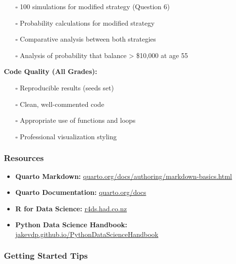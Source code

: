 \documentclass[
  letterpaper,
  DIV=11,
  numbers=noendperiod]{scrartcl}
\providecommand{\tightlist}{%
  \setlength{\itemsep}{0pt}\setlength{\parskip}{0pt}}
\theoremstyle{definition}
\theoremstyle{remark}
\begin{document}
\begin{itemize}
\tightlist
\item[$\square$]
  100 simulations for modified strategy (Question 6)
\item[$\square$]
  Probability calculations for modified strategy
\item[$\square$]
  Comparative analysis between both strategies
\item[$\square$]
  Analysis of probability that balance \textgreater{} \$10,000 at age 55
\end{itemize}

\textbf{Code Quality (All Grades):}

\begin{itemize}
\tightlist
\item[$\square$]
  Reproducible results (seeds set)
\item[$\square$]
  Clean, well-commented code
\item[$\square$]
  Appropriate use of functions and loops
\item[$\square$]
  Professional visualization styling
\end{itemize}

\subsubsection{Resources}\label{resources}

\begin{itemize}
\tightlist
\item
  \textbf{Quarto Markdown:}
  \href{https://quarto.org/docs/authoring/markdown-basics.html}{quarto.org/docs/authoring/markdown-basics.html}
\item
  \textbf{Quarto Documentation:}
  \href{https://quarto.org/docs}{quarto.org/docs}
\item
  \textbf{R for Data Science:}
  \href{https://r4ds.had.co.nz}{r4ds.had.co.nz}
\item
  \textbf{Python Data Science Handbook:}
  \href{https://jakevdp.github.io/PythonDataScienceHandbook}{jakevdp.github.io/PythonDataScienceHandbook}
\end{itemize}

\subsubsection{Getting Started Tips}\label{getting-started-tips}
\end{document}
